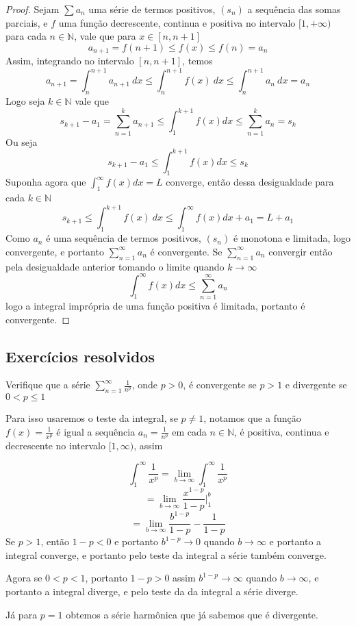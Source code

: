 \begin{proof}
    Sejam $\sum a_n$ uma série de termos positivos, $(s_n)$ a sequência das somas
    parciais, e $f$ uma função decrescente, continua e positiva no intervalo
    $[1, +\infty)$ para cada $n \in \mathbb{N}$, vale que para $x \in [n, n+1]$
    $$a_{n+1} = f(n+1) \leq f(x) \leq f(n) = a_{n} $$
    Assim, integrando no intervalo $[n,n+1]$, temos
    $$a_{n+1} = \int_n^{n+1} a_{n+1} \: dx \leq \int_n^{n+1} f(x) \: dx \leq 
    \int_n^{n+1} a_{n} \: dx = a_{n} $$
    Logo seja $k \in \mathbb{N}$ vale que
    $$s_{k+1} - a_1 = \sum_{n = 1}^k a_{n+1} \leq \int_1^{k+1} f(x) dx\leq 
    \sum_{n = 1}^k a_{n} = s_k$$
    Ou seja
    $$s_{k+1} - a_1 \leq \int_{1}^{k+1}f(x) dx \leq s_{k}$$
    Suponha agora que $\int_{1}^{\infty} f(x) dx = L$ converge, então dessa 
    desigualdade para cada $k \in \mathbb{N}$
    $$s_{k+1} \leq \int_{1}^{k+1}f(x) \: dx \leq \int_{1}^{\infty} f(x) dx + a_1 =L + a_1$$
    Como $a_n$ é uma sequência de termos positivos, $(s_n)$ é monotona e limitada,
    logo convergente, e portanto $\sum_{n=1}^{\infty} a_n$ é convergente.
    Se $\sum_{n=1}^{\infty} a_n$ convergir então pela desigualdade anterior
    tomando o limite quando $k \to \infty$
    $$\int_{1}^{\infty} f(x) dx \leq \sum_{n=1}^{\infty} a_n$$
    logo a integral imprópria de uma função positiva é limitada, portanto é
    convergente.
\end{proof}
\subsection*{Exercícios resolvidos}

\construirExeresol
\begin{exeresol}
    Verifique que a série $\sum_{n = 1}^{\infty} \frac{1}{n^p}$, onde $p>0$, é
    convergente se $p>1$ e divergente se $0 < p \leq 1$ 
\end{exeresol}

\begin{resol}
    Para isso usaremos o teste da integral, se $p\neq 1$, notamos que a função 
    $f(x) = \frac{1}{x^p}$ é igual a sequência $a_n = \frac{1}{n^p}$ em cada 
    $n \in \mathbb{N}$, é positiva, continua e decrescente no intervalo $[1, \infty)$,
    assim

    $$\int_1^{\infty} \frac{1}{x^p} = \lim_{b \rightarrow \infty} \int_1^{\infty} 
    \frac{1}{x^p}$$
    $$ = \lim_{b \rightarrow \infty} \frac{x^{1-p}}{1-p}\bigg|_{1}^b$$
    $$ = \lim_{b \rightarrow \infty} \frac{b^{1-p}}{1-p} -\frac{1}{1-p}$$
    Se $p>1$, então $1-p<0$ e portanto $b^{1-p} \to 0$ quando $b \to \infty$
    e portanto a integral converge, e portanto pelo teste da integral a série
    também converge.

    Agora se $0 < p<1$, portanto $1-p>0$ assim $b^{1-p} \to \infty$ quando 
    $b \to \infty$, e portanto a integral diverge, e pelo teste da da integral
    a série diverge.
    
    Já para $p = 1$ obtemos a série harmônica que já sabemos que é divergente.
\end{resol}


